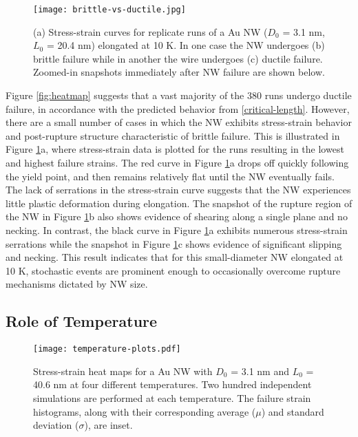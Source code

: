 \documentclass[10pt]{report}  %
\begin{document}
%
%
\begin{figure}[t!]
       \centering
	\texttt{[image: brittle-vs-ductile.jpg]}
	\caption{(a) Stress-strain curves for replicate runs of a Au NW ($D_{0}$ = 3.1 nm, $L_{0}$ = 20.4 nm) elongated at 10 K. In one case the NW undergoes (b) brittle failure while in another the wire undergoes (c) ductile failure. Zoomed-in snapshots immediately after NW failure are shown below. }
	\label{fig:brittle-vs-ductile}
\end{figure}

Figure \ref{fig:heatmap} suggests that a vast majority of the 380 runs undergo ductile failure, in accordance with the predicted behavior from \ref{critical-length}. However, there are a small number of cases in which the NW exhibits stress-strain behavior and post-rupture structure characteristic of brittle failure. This is illustrated in Figure \ref{fig:brittle-vs-ductile}a, where stress-strain data is plotted for the runs resulting in the lowest and highest failure strains. The red curve in Figure \ref{fig:brittle-vs-ductile}a drops off quickly following the yield point, and then remains relatively flat until the NW eventually fails. The lack of serrations in the stress-strain curve suggests that the NW experiences  little plastic deformation during elongation. The snapshot of the rupture region of the NW in Figure \ref{fig:brittle-vs-ductile}b also shows evidence of shearing along a single plane and no necking. In contrast, the black curve in Figure \ref{fig:brittle-vs-ductile}a exhibits numerous stress-strain serrations while the snapshot in Figure \ref{fig:brittle-vs-ductile}c shows evidence of significant slipping and necking. This result indicates that for this small-diameter NW elongated at 10 K, stochastic events are prominent enough to occasionally overcome rupture mechanisms dictated by NW size.




\subsection{Role of Temperature}

\begin{figure}[b!]
       \centering
	\texttt{[image: temperature-plots.pdf]}
	\caption{Stress-strain heat maps for a Au NW with $D_{0}$ = 3.1 nm and $L_{0}$ = 40.6 nm at four different temperatures. Two hundred independent simulations are performed at each temperature. The failure strain histograms, along with their corresponding average ($\mu$) and standard deviation ($\sigma$), are inset. }
	\label{fig:temperature-plots}
\end{figure}
\end{document}
